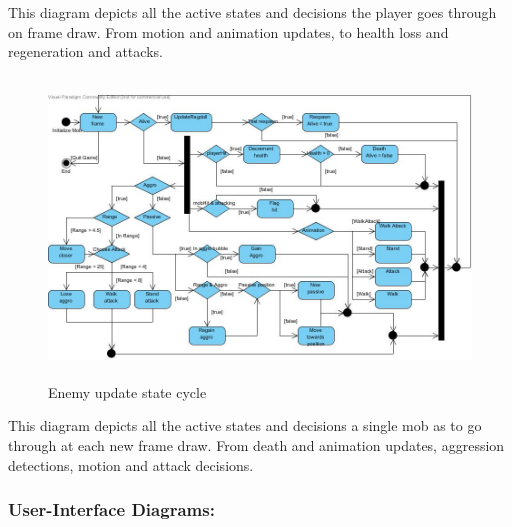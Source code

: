 \documentclass[letterpaper]{article}
\begin{document}
					This diagram depicts all the active states and decisions the player goes through on frame draw. From motion and animation updates, to health loss and regeneration and attacks.
					
					\begin{figure}[H]
					\centering
					\includegraphics[width=180mm, height=80mm]{UML_Diagram/State/Mob_State.jpg}
					\caption{Enemy update state cycle}
					\label{overflow}
					\end{figure}
					
					This diagram depicts all the active states and decisions a single mob as to go through at each new frame draw. From death and animation updates, aggression detections, motion and attack decisions.
			
				\subsubsection*{User-Interface Diagrams:}
				\vspace{0.1in}
				
\end{document}
